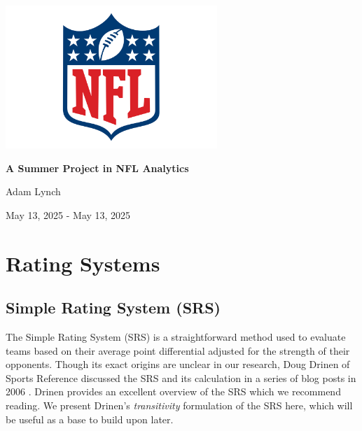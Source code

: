 \documentclass{report}
\begin{document}
\begin{titlepage}
    \centering

    \includegraphics[width=8cm]{images/nfl_logo.png}\par\vspace{1cm}

    \vspace{0.5cm}
    {\huge\bfseries A Summer Project in NFL Analytics \par}
    \vspace{2cm}

    {\Large Adam Lynch \par}
    \vspace{1cm}

    {\large May 13, 2025 - May 13, 2025 \par}

    \vfill
\end{titlepage}

\tableofcontents
\newpage

\chapter{Rating Systems}

\section{Simple Rating System (SRS)}

The Simple Rating System (SRS) is a straightforward method used to evaluate teams based on their average point differential adjusted for the strength of their opponents. 
Though its exact origins are unclear in our research, Doug Drinen of Sports Reference discussed the SRS and its calculation in a series of blog posts in 2006 \cite{drinen06-1,drinen06-2}.
Drinen provides an excellent overview of the SRS which we recommend reading.
We present Drinen's \textit{transitivity} formulation of the SRS here, which will be useful as a base to build upon later.
\end{document}
